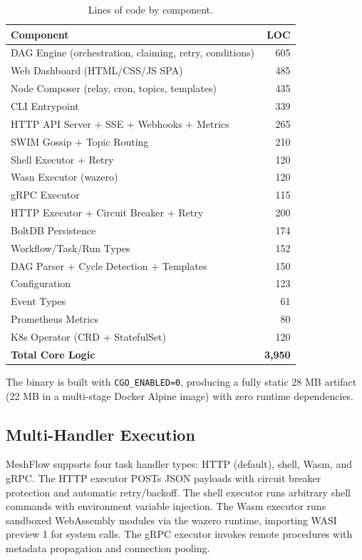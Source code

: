\documentclass[sigconf]{acmart}
\begin{document}
\begin{table}[h]
\centering
\caption{Lines of code by component.}
\label{tab:code-size}
\begin{tabular}{lr}
\toprule
\textbf{Component} & \textbf{LOC} \\
\midrule
DAG Engine (orchestration, claiming, retry, conditions) & 605 \\
Web Dashboard (HTML/CSS/JS SPA) & 485 \\
Node Composer (relay, cron, topics, templates) & 435 \\
CLI Entrypoint & 339 \\
HTTP API Server + SSE + Webhooks + Metrics & 265 \\
SWIM Gossip + Topic Routing & 210 \\
Shell Executor + Retry & 120 \\
Wasn Executor (wazero) & 120 \\
gRPC Executor & 115 \\
HTTP Executor + Circuit Breaker + Retry & 200 \\
BoltDB Persistence & 174 \\
Workflow/Task/Run Types & 152 \\
DAG Parser + Cycle Detection + Templates & 150 \\
Configuration & 123 \\
Event Types & 61 \\
Prometheus Metrics & 80 \\
K8s Operator (CRD + StatefulSet) & 120 \\
\midrule
\textbf{Total Core Logic} & \textbf{3,950} \\
\bottomrule
\end{tabular}
\end{table}

The binary is built with \texttt{CGO\_ENABLED=0}, producing a fully static 28 MB artifact (22 MB in a multi-stage Docker Alpine image) with zero runtime dependencies.

\subsection{Multi-Handler Execution}

MeshFlow supports four task handler types: HTTP (default), shell, Wasm, and gRPC. The HTTP executor POSTs JSON payloads with circuit breaker protection and automatic retry/backoff. The shell executor runs arbitrary shell commands with environment variable injection. The Wasm executor runs sandboxed WebAssembly modules via the wazero runtime, importing WASI preview 1 for system calls. The gRPC executor invokes remote procedures with metadata propagation and connection pooling.
\end{document}
